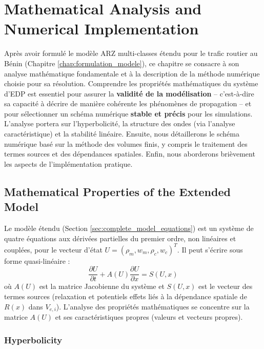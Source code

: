 \chapter{Mathematical Analysis and Numerical Implementation}
\label{chap:analyse_numerique}

Après avoir formulé le modèle ARZ multi-classes étendu pour le trafic routier au Bénin (Chapitre \ref{chap:formulation_modele}), ce chapitre se consacre à son analyse mathématique fondamentale et à la description de la méthode numérique choisie pour sa résolution. Comprendre les propriétés mathématiques du système d'EDP est essentiel pour assurer la \textbf{validité de la modélisation} – c'est-à-dire sa capacité à décrire de manière cohérente les phénomènes de propagation – et pour sélectionner un schéma numérique \textbf{stable et précis} pour les simulations. L'analyse portera sur l'hyperbolicité, la structure des ondes (via l'analyse caractéristique) et la stabilité linéaire. Ensuite, nous détaillerons le schéma numérique basé sur la méthode des volumes finis, y compris le traitement des termes sources et des dépendances spatiales. Enfin, nous aborderons brièvement les aspects de l'implémentation pratique.

\section{Mathematical Properties of the Extended Model}
\label{sec:math_properties}

Le modèle étendu (Section \ref{sec:complete_model_equations}) est un système de quatre équations aux dérivées partielles du premier ordre, non linéaires et couplées, pour le vecteur d'état \( U = (\rho_m, w_m, \rho_c, w_c)^T \). Il peut s'écrire sous forme quasi-linéaire :
\begin{equation}
    \label{eq:quasi_linear_form}
    \frac{\partial U}{\partial t} + A(U) \frac{\partial U}{\partial x} = S(U, x)
\end{equation}
où \( A(U) \) est la matrice Jacobienne du système et \( S(U, x) \) est le vecteur des termes sources (relaxation et potentiels effets liés à la dépendance spatiale de \( R(x) \) dans \( V_{e,i} \)). L'analyse des propriétés mathématiques se concentre sur la matrice \( A(U) \) et ses caractéristiques propres (valeurs et vecteurs propres).

\subsection{Hyperbolicity}
\label{subsec:hyperbolicity}

